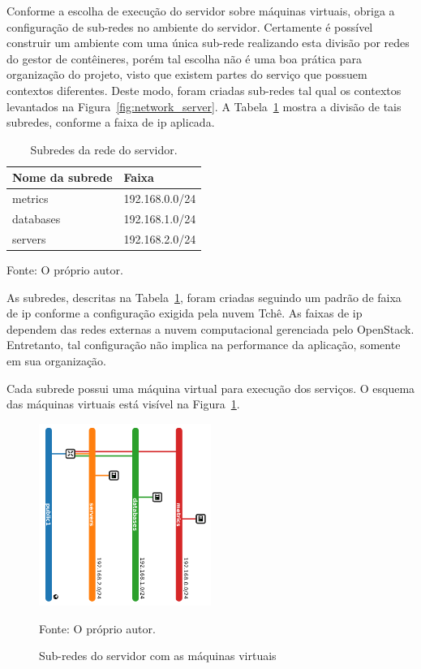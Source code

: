 Conforme a escolha de execução do servidor sobre máquinas virtuais, obriga a configuração de sub-redes no ambiente do servidor.
%
Certamente é possível construir um ambiente com uma única sub-rede realizando esta divisão por redes do gestor de contêineres, porém tal escolha não é uma boa prática para organização do projeto, visto que existem partes do serviço que possuem contextos diferentes.
%
Deste modo, foram criadas sub-redes tal qual os contextos levantados na Figura~\ref{fig:network_server}.
%
A Tabela~\ref{tab:subredes} mostra a divisão de tais subredes, conforme a faixa de \ac{ip} aplicada.



\begin{table}[htb!]
\centering
\begin{adjustbox}{max width=\textwidth}
\caption{Subredes da rede do servidor.}
\label{tab:subredes}
\begin{tabular}{|l|l|}
\hline
Nome da subrede & Faixa          \\ \hline
metrics         & 192.168.0.0/24 \\ \hline
databases       & 192.168.1.0/24 \\ \hline
servers         & 192.168.2.0/24 \\ \hline
\end{tabular}
\end{adjustbox}

Fonte: O próprio autor.
\end{table}



As subredes, descritas na Tabela~\ref{tab:subredes}, foram criadas seguindo um padrão de faixa de \ac{ip} conforme a configuração exigida pela nuvem Tchê.
%
As faixas de \ac{ip} dependem das redes externas a nuvem computacional gerenciada pelo OpenStack.
%
Entretanto, tal configuração não implica na performance da aplicação, somente em sua organização.

Cada subrede possui uma máquina virtual para execução dos serviços.
%
O esquema das máquinas virtuais está visível na Figura~\ref{fig:virtual_machines}.




\begin{figure}[htb!]
  \caption{Sub-redes do servidor com as máquinas virtuais}
  \label{fig:virtual_machines}
  \includegraphics[width=0.5\textwidth]{figuras/network/bars.png}
  \centering

  Fonte: O próprio autor.
\end{figure}



